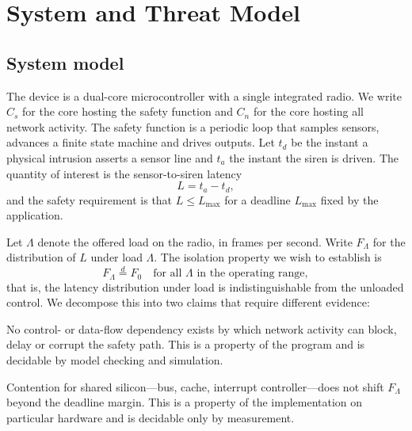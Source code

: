 \section{System and Threat Model}\label{sec:model}

\subsection{System model}

The device is a dual-core microcontroller with a single integrated radio. We write $C_{s}$ for
the core hosting the safety function and $C_{n}$ for the core hosting all network activity. The
safety function is a periodic loop that samples sensors, advances a finite state machine and
drives outputs. Let $t_{d}$ be the instant a physical intrusion asserts a sensor line and
$t_{a}$ the instant the siren is driven. The quantity of interest is the sensor-to-siren latency
\begin{equation}
L = t_{a} - t_{d},
\label{eq:latency}
\end{equation}
and the safety requirement is that $L \le L_{\max}$ for a deadline $L_{\max}$ fixed by the
application.

Let $\Lambda$ denote the offered load on the radio, in frames per second. Write $F_{\Lambda}$ for
the distribution of $L$ under load $\Lambda$. The isolation property we wish to establish is
\begin{equation}
F_{\Lambda} \stackrel{d}{=} F_{0} \quad \text{for all } \Lambda \text{ in the operating range},
\label{eq:invariance}
\end{equation}
that is, the latency distribution under load is indistinguishable from the unloaded control. We
decompose this into two claims that require different evidence:

\begin{description}[leftmargin=1.6em,itemsep=0.2em]
\item[Logical isolation.] No control- or data-flow dependency exists by which network activity
can block, delay or corrupt the safety path. This is a property of the program and is decidable
by model checking and simulation.
\item[Timing isolation.] Contention for shared silicon---bus, cache, interrupt controller---does
not shift $F_{\Lambda}$ beyond the deadline margin. This is a property of the implementation on
particular hardware and is decidable only by measurement.
\end{description}

